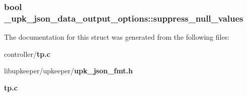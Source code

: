 \subsubsection[{suppress\_\-null\_\-values}]{\setlength{\rightskip}{0pt plus 5cm}bool {\bf \_\-upk\_\-json\_\-data\_\-output\_\-options::suppress\_\-null\_\-values}}\label{struct__upk__json__data__output__options_a1b9731dcbdf8b672fff36e22fb01ec93}


The documentation for this struct was generated from the following files:\begin{DoxyCompactItemize}
\item 
controller/{\bf tp.c}\item 
libupkeeper/upkeeper/{\bf upk\_\-json\_\-fmt.h}\item 
{\bf tp.c}\end{DoxyCompactItemize}
